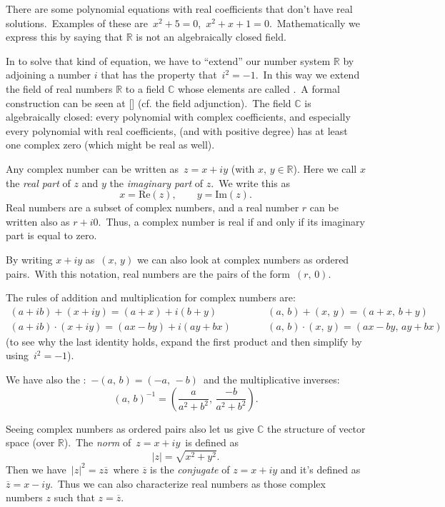 \documentclass{article}
\begin{document}


There are some polynomial equations with real coefficients that don't have real solutions.\, Examples of these are\, $x^2+5=0$,\, $x^2+x+1=0$.\, Mathematically we express this by saying that $\mathbb{R}$ is not an algebraically closed field.

In  to solve that kind of equation, we have to ``extend'' our number system $\mathbb{R}$ by adjoining a number $i$ that has the property that\, $i^2=-1$.\, In this way we extend the field of real numbers $\mathbb{R}$ to a field $\mathbb{C}$ whose elements are called \emph{}.\, A formal construction can be seen at [] (cf. the field adjunction).\, The field $\mathbb{C}$ is algebraically closed: every polynomial with complex coefficients, and especially every polynomial with real coefficients, (and with positive degree) has at least one complex zero (which might be real as well).

Any complex number can be written as\, $z = x+iy$ (with $x,\,y\in\mathbb{R}$). Here we call $x$ the {\em real part}  of $z$ and $y$ the {\em imaginary part} of $z$.\,
We write this as 
$$x=\mbox{Re}(z), \qquad y=\mbox{Im}(z).$$
Real numbers are a subset of complex numbers, and a real number $r$ can be written also as $r+i0$.\, Thus, a complex number is real if and only if its imaginary part is equal to zero.

By writing $x\!+\!iy$ as\, $(x,\,y)$ we can also look at complex numbers as ordered pairs.\, With this notation, real numbers are the pairs of the form\, $(r,\,0)$. 

The rules of addition and multiplication for complex numbers are:
\begin{eqnarray*}
(a+ib)+(x+iy)=(a+x)+i(b+y)&\qquad&(a,\,b)+(x,\,y) = (a+x,\,b+y)\\
(a+ib)\cdot(x+iy)=(ax-by)+i(ay+bx)&\qquad&(a,\,b)\cdot(x,\,y)=(ax-by,\,ay+bx)
\end{eqnarray*}
(to see why the last identity holds, expand the first product and then simplify 
by using\, $i^2 = -1$).

We have also the :\, $-(a,\,b) =
(-a,\,-b)$\, and the multiplicative inverses:
$$(a,\,b)^{-1}=\left(\frac{a}{a^2+b^2},\,\frac{-b}{a^2+b^2}\right).$$

Seeing complex numbers as ordered pairs also let us give $\mathbb{C}$ the structure of vector space (over $\mathbb{R}$).\, The \emph{norm} of\, $z = x+iy$\, is defined as
$$|z| = \sqrt{x^2+y^2}.$$
Then we have\, $|z|^2=z\overline{z}$\, where $\overline{z}$ is the \emph{conjugate} of $z = x+iy$ and it's defined as\, $\overline{z} = x-iy$.\, Thus we can also characterize real numbers as those complex numbers $z$ such that $z=\overline{z}$.
\end{document}
